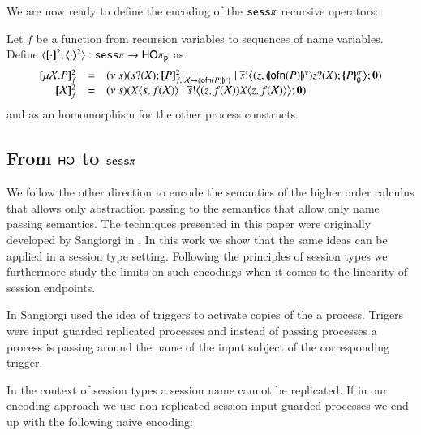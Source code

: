 We are now ready to define the encoding of the $\mathtt{sess}\pi$ recursive
operators:
\begin{definition}
Let $f$ be a function from recursion variables to sequences of name variables.
	Define $\encod{\cdot}{\cdot}{2}: \sesp \to \pHOp$ as
\[
\begin{array}{rcl}
	\pmapp{\rec{X}{P}}{2}{f} &=& \newsp{s}{\binp{s}{\X} \pmapp{P}{2}{{f,\{\rvar{X}\to \vmap{\ofn{P}}\}}} \Par \bbout{\dual{s}}{\abs{z , \vmap{\ofn{P}}}{\binp{z}{\X} \auxmapp{P}{\sigma}{\es}}} \inact}\\
	\pmapp{\rvar{X}}{2}{f} &=& \newsp{s}{\appl{\X}{s, f(\rvar{X})} \Par \bbout{\dual{s}}{ \abs{z, f(\rvar{X})}{\appl{X}{z, f(\rvar{X})}}} \inact}
\end{array}
\]
and as an homomorphism for the other process constructs. 
\end{definition}



\subsection{From $\mathsf{HO}$ to $\mathtt{sess}\pi$}

We follow the other direction to encode the semantics of the
higher order calculus that allows only abstraction passing
to the semantics that allow only name passing semantics.
The techniques presented in this paper were originally developed
by Sangiorgi in \cite{}. In this work we show that
the same ideas can be applied in a session type setting.
Following the principles of session types we furthermore
study the limits on such encodings when it comes to the linearity
of session endpoints.

In \cite{} Sangiorgi used the idea of triggers to activate
copies of the a process. Trigers were input guarded replicated
processes and instead of passing processes a process is
passing around the name of the input subject of the corresponding trigger.

In the context of session types a session name cannot be replicated.
If in our encoding approach we use non replicated session input guarded
processes we end up with the following naive encoding:

